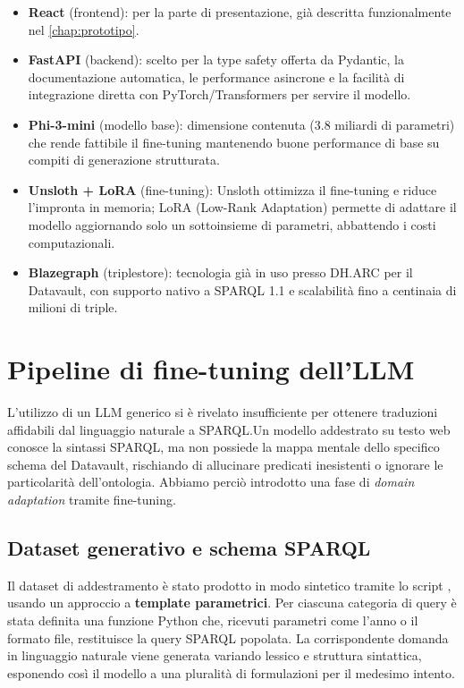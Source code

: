     \begin{itemize}
      \item \textbf{React} (frontend): per la parte di presentazione, già descritta funzionalmente nel \cref{chap:prototipo}.
      \item \textbf{FastAPI} (backend): scelto per la type safety offerta da Pydantic, la documentazione automatica, le performance asincrone e la facilità di integrazione diretta con PyTorch/Transformers per servire il modello.
      \item \textbf{Phi-3-mini} (modello base): dimensione contenuta (3.8 miliardi di parametri) che rende fattibile il fine-tuning mantenendo buone performance di base su compiti di generazione strutturata.
      \item \textbf{Unsloth + LoRA} (fine-tuning): Unsloth ottimizza il fine-tuning e riduce l'impronta in memoria; LoRA (Low-Rank Adaptation) permette di adattare il modello aggiornando solo un sottoinsieme di parametri, abbattendo i costi computazionali.
      \item \textbf{Blazegraph} (triplestore): tecnologia già in uso presso DH.ARC per il Datavault, con supporto nativo a SPARQL 1.1 e scalabilità fino a centinaia di milioni di triple.
    \end{itemize}


\section{Pipeline di fine-tuning dell'LLM}\label{sec:finetuning}
  L'utilizzo di un LLM generico si è rivelato insufficiente per ottenere traduzioni affidabili dal linguaggio naturale a SPARQL.\@ Un modello addestrato su testo web conosce la sintassi SPARQL, ma non possiede la mappa mentale dello specifico schema del Datavault, rischiando di allucinare predicati inesistenti o ignorare le particolarità dell'ontologia. Abbiamo perciò introdotto una fase di \textit{domain adaptation} tramite fine-tuning.

  \subsection{Dataset generativo e schema SPARQL}\label{subsec:dataset_gen}
    Il dataset di addestramento è stato prodotto in modo sintetico tramite lo script , usando un approccio a \textbf{template parametrici}. Per ciascuna categoria di query è stata definita una funzione Python che, ricevuti parametri come l'anno o il formato file, restituisce la query SPARQL popolata. 
    La corrispondente domanda in linguaggio naturale viene generata variando lessico e struttura sintattica, esponendo così il modello a una pluralità di formulazioni per il medesimo intento.
    \newpage

